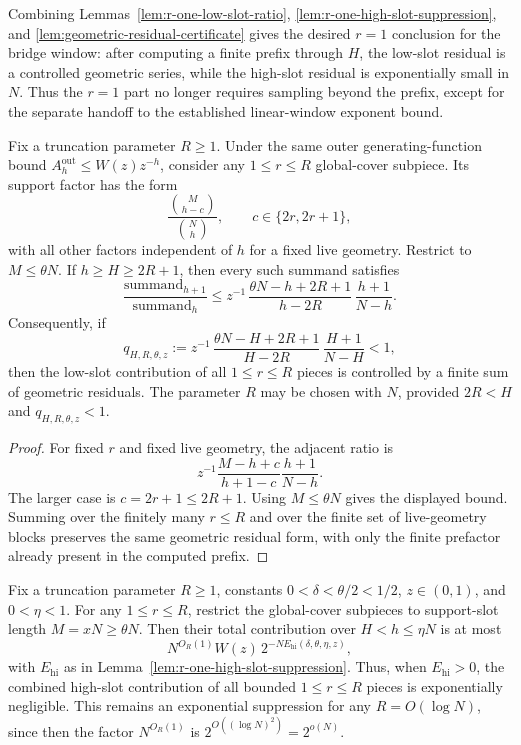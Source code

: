 Combining Lemmas~\ref{lem:r-one-low-slot-ratio}, \ref{lem:r-one-high-slot-suppression}, and
\ref{lem:geometric-residual-certificate} gives the desired \(r=1\) conclusion for the bridge window: after computing a
finite prefix through \(H\), the low-slot residual is a controlled geometric series, while the high-slot residual is
exponentially small in \(N\).  Thus the \(r=1\) part no longer requires sampling beyond the prefix, except for the
separate handoff to the established linear-window exponent bound.

\begin{lemma}
\label{lem:bounded-r-low-slot-ratio}
Fix a truncation parameter \(R\ge1\).  Under the same outer generating-function bound
\(A_h^{\mathrm{out}}\le W(z)z^{-h}\), consider any \(1\le r\le R\) global-cover subpiece.  Its support factor has the
form
\[
\frac{\binom{M}{h-c}}{\binom{N}{h}},
\qquad
c\in\{2r,2r+1\},
\]
with all other factors independent of \(h\) for a fixed live geometry.  Restrict to \(M\le\theta N\).  If
\(h\ge H\ge2R+1\), then every such summand satisfies
\[
\frac{\text{summand}_{h+1}}{\text{summand}_{h}}
\le
z^{-1}\,
\frac{\theta N-h+2R+1}{h-2R}\,
\frac{h+1}{N-h}.
\]
Consequently, if
\[
q_{H,R,\theta,z}
:=
z^{-1}\,
\frac{\theta N-H+2R+1}{H-2R}\,
\frac{H+1}{N-H}
<1,
\]
then the low-slot contribution of all \(1\le r\le R\) pieces is controlled by a finite sum of geometric residuals.
The parameter \(R\) may be chosen with \(N\), provided \(2R<H\) and \(q_{H,R,\theta,z}<1\).
\end{lemma}

\begin{proof}
For fixed \(r\) and fixed live geometry, the adjacent ratio is
\[
z^{-1}
\frac{M-h+c}{h+1-c}
\frac{h+1}{N-h}.
\]
The larger case is \(c=2r+1\le2R+1\).  Using \(M\le\theta N\) gives the displayed bound.  Summing over the finitely
many \(r\le R\) and over the finite set of live-geometry blocks preserves the same geometric residual form, with only
the finite prefactor already present in the computed prefix.
\end{proof}

\begin{lemma}
\label{lem:bounded-r-high-slot-suppression}
Fix a truncation parameter \(R\ge1\), constants \(0<\delta<\theta/2<1/2\), \(z\in(0,1)\), and \(0<\eta<1\).  For
any \(1\le r\le R\), restrict the global-cover subpieces to support-slot length \(M=xN\ge\theta N\).  Then their total
contribution over \(H<h\le\eta N\) is at most
\[
N^{O_R(1)}W(z)\,
2^{-N E_{\mathrm{hi}}(\delta,\theta,\eta,z)},
\]
with \(E_{\mathrm{hi}}\) as in Lemma~\ref{lem:r-one-high-slot-suppression}.  Thus, when \(E_{\mathrm{hi}}>0\), the
combined high-slot contribution of all bounded \(1\le r\le R\) pieces is exponentially negligible.
This remains an exponential suppression for any \(R=O(\log N)\), since then the factor \(N^{O_R(1)}\) is
\(2^{O((\log N)^2)}=2^{o(N)}\).
\end{lemma}

